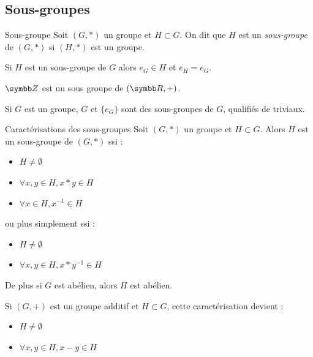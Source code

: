 \subsection{Sous-groupes}

\begin{definition}{Sous-groupe}{}
    Soit $(G, \ast)$ un groupe et $H \subset G$. On dit que $H$ est un \emph{sous-groupe} de
    $(G, \ast)$ si $(H, \ast)$ est un groupe.
\end{definition}

\begin{remarque}
    Si $H$ est un sous-groupe de $G$ alors $e_G \in H$ et $e_H = e_G$.
\end{remarque}

\begin{exemple}
    $\Z$ est un sous groupe de $(\R,+)$.

    Si $G$ est un groupe, $G$ et $\{e_G\}$ sont des sous-groupes de $G$, qualifiés de triviaux.    
\end{exemple}

\begin{proposition}{Caractérisations des sous-groupes}{}
    Soit $(G, \ast)$ un groupe et $H \subset G$. 
    Alors $H$ est un sous-groupe de $(G, \ast)$ ssi :
    \begin{itemize}
        \item $H \neq \emptyset$
        \item $\forall x, y \in H, x \ast y \in H$ 
        \item $\forall x \in H, x^{-1} \in H$
    \end{itemize}
    ou plus simplement ssi :
    \begin{itemize}
        \item $H \neq \emptyset$
        \item $\forall x, y \in H, x \ast y^{-1} \in H$
    \end{itemize}

    De plus si $G$ est abélien, alors $H$ est abélien.
\end{proposition}

\begin{remarque}
    Si $(G, +)$ est un groupe additif et $H \subset G$, cette caractérisation devient : 
    \begin{itemize}
        \item $H \neq \emptyset$
        \item $\forall x, y \in H, x - y \in H$
    \end{itemize}
\end{remarque}

